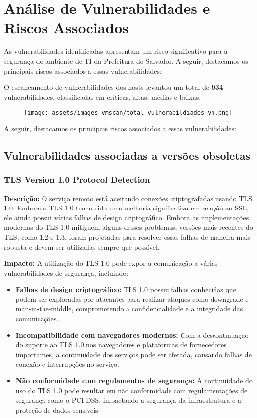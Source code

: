 \documentclass[a4paper,12pt]{article}
\begin{document}
\section{Análise de Vulnerabilidades e Riscos Associados}
As vulnerabilidades identificadas apresentam um risco significativo para a segurança do ambiente de TI da Prefeitura de Salvador. A seguir, destacamos os principais riscos associados a essas vulnerabilidades:

O escaneamento de vulnerabilidades dos hosts levantou um total de \textbf{934} vulnerabilidades, classificadas em críticas, altas, médias e baixas.

   \begin{figure}[h!]
    \centering
    \texttt{[image: assets/images-vmscan/total vulnerabildiades vm.png]} 
    \end{figure}
    \FloatBarrier

A seguir, destacamos os principais riscos associados a essas vulnerabilidades: 


\subsection{Vulnerabilidades associadas a versões obsoletas}
\subsubsection{TLS Version 1.0 Protocol Detection}

\textbf{Descrição:} O serviço remoto está aceitando conexões criptografadas usando TLS 1.0. Embora o TLS 1.0 tenha sido uma melhoria significativa em relação ao SSL, ele ainda possui várias falhas de design criptográfico. Embora as implementações modernas do TLS 1.0 mitiguem alguns desses problemas, versões mais recentes do TLS, como 1.2 e 1.3, foram projetadas para resolver essas falhas de maneira mais robusta e devem ser utilizadas sempre que possível.

\textbf{Impacto:} A utilização do TLS 1.0 pode expor a comunicação a várias vulnerabilidades de segurança, incluindo: 
    \begin{itemize} 
        \item \textbf{Falhas de design criptográfico:} TLS 1.0 possui falhas conhecidas que podem ser exploradas por atacantes para realizar ataques como downgrade e man-in-the-middle, comprometendo a confidencialidade e a integridade das comunicações. 
        \item \textbf{Incompatibilidade com navegadores modernos:} Com a descontinuação do suporte ao TLS 1.0 nos navegadores e plataformas de fornecedores importantes, a continuidade dos serviços pode ser afetada, causando falhas de conexão e interrupções no serviço. 
        \item \textbf{Não conformidade com regulamentos de segurança:} A continuidade do uso do TLS 1.0 pode resultar em não conformidade com regulamentações de segurança como o PCI DSS, impactando a segurança da infraestrutura e a proteção de dados sensíveis. 
\end{itemize}
\end{document}
